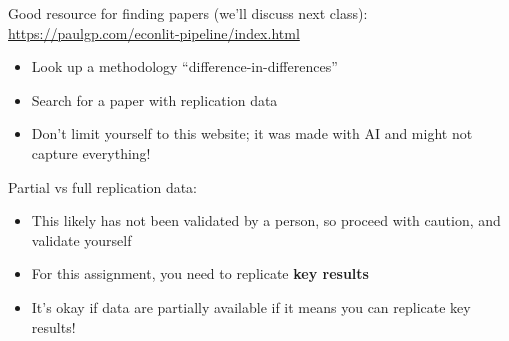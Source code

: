 \documentclass[compress, 8pt]{beamer}
\begin{document}
\begin{frame}
Good resource for finding papers (we'll discuss next class): \url{https://paulgp.com/econlit-pipeline/index.html}
\begin{itemize}
    \item Look up a methodology ``difference-in-differences''
    \item Search for a paper with replication data

    \item Don't limit yourself to this website; it was made with AI and might not capture everything!
\end{itemize}

\vspace{2ex}
Partial vs full replication data:
\begin{itemize}
    \item This likely has not been validated by a person, so proceed with caution, and validate yourself
    \item For this assignment, you need to replicate \textbf{key results}
    \item It's okay if data are partially available if it means you can replicate key results!
\end{itemize}
\end{frame}
\end{document}
